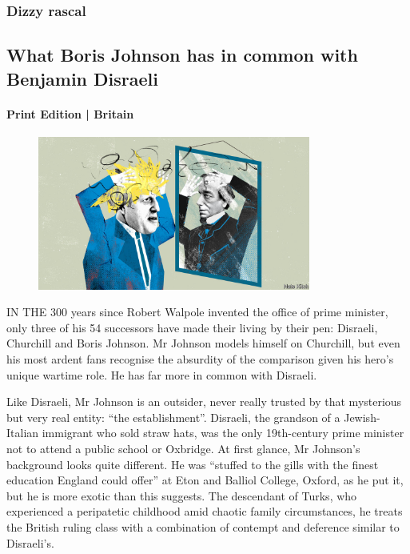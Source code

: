 \documentclass{article}
\begin{document}
\subsubsection{Dizzy rascal }
\subsection{What Boris Johnson has in common with Benjamin Disraeli }
\paragraph{Print Edition | Britain  \quad \color{gray}{Mar 27th 2021 }}
\begin{figure}[h]
\centering
\includegraphics[width=0.8\textwidth]{images/20210327_BRD000_0.jpg}
\end{figure}
\lettrine{I}N THE 300 years since Robert Walpole invented the office of prime minister, only three of his 54 successors have made their living by their pen: Disraeli, Churchill and Boris Johnson. Mr Johnson models himself on Churchill, but even his most ardent fans recognise the absurdity of the comparison given his hero's unique wartime role. He has far more in common with Disraeli. 

Like Disraeli, Mr Johnson is an outsider, never really trusted by that mysterious but very real entity: ``the establishment''. Disraeli, the grandson of a Jewish-Italian immigrant who sold straw hats, was the only 19th-century prime minister not to attend a public school or Oxbridge. At first glance, Mr Johnson's background looks quite different. He was ``stuffed to the gills with the finest education England could offer'' at Eton and Balliol College, Oxford, as he put it, but he is more exotic than this suggests. The descendant of Turks, who experienced a peripatetic childhood amid chaotic family circumstances, he treats the British ruling class with a combination of contempt and deference similar to Disraeli's. 
\end{document}
